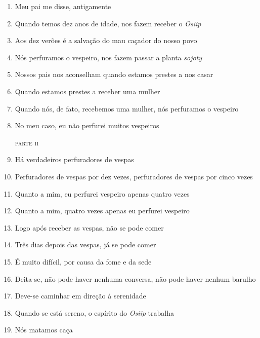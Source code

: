 \begin{enumerate}
 \item Meu pai me disse, antigamente
 \item Quando temos dez anos de idade, nos fazem receber o \textit{Osiip}
 \item Aos dez verões é a salvação do mau caçador do nosso povo
 \item Nós perfuramos o vespeiro, nos fazem passar a planta \textit{sojoty}
 \begin{center}\end{center}
 \item Nossos pais nos aconselham quando estamos prestes a nos casar
 \item Quando estamos prestes a receber uma mulher
 \item Quando nós, de fato, recebemos uma mulher, nós perfuramos o vespeiro
 \item No meu caso, eu não perfurei muitos vespeiros
 
 \begin{flushright}\textsc{parte ii}\end{flushright}
 
 \item Há verdadeiros perfuradores de vespas
 \item Perfuradores de vespas por dez vezes, perfuradores de vespas por cinco vezes
 \item Quanto a mim, eu perfurei vespeiro apenas quatro vezes
 \item Quanto a mim, quatro vezes apenas eu perfurei vespeiro
 
 \begin{center}\end{center}
 
 \item Logo após receber as vespas, não se pode comer
 \item Três dias depois das vespas, já se pode comer
 \item É muito difícil, por causa da fome e da sede
 \item Deita-se, não pode haver nenhuma conversa, não pode haver nenhum
 barulho
 \item Deve-se caminhar em direção à serenidade
 \item Quando se está sereno, o espírito do \textit{Osiip} trabalha
 \item Nós matamos caça
 
 \begin{center}\end{center}
 

\end{enumerate}
